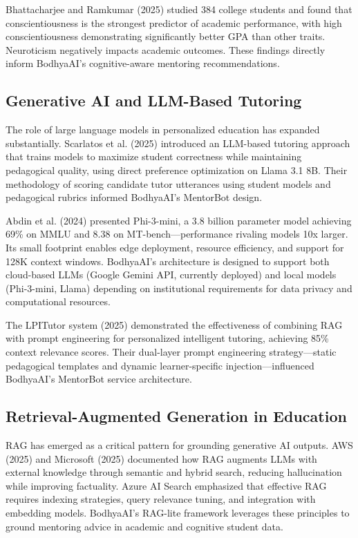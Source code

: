 \documentclass[conference]{IEEEtran}
\begin{document}
Bhattacharjee and Ramkumar (2025) studied 384 college students and found that conscientiousness is the strongest predictor of academic performance, with high conscientiousness demonstrating significantly better GPA than other traits. Neuroticism negatively impacts academic outcomes. These findings directly inform BodhyaAI's cognitive-aware mentoring recommendations.

\subsection{Generative AI and LLM-Based Tutoring}
The role of large language models in personalized education has expanded substantially. Scarlatos et al. (2025) introduced an LLM-based tutoring approach that trains models to maximize student correctness while maintaining pedagogical quality, using direct preference optimization on Llama 3.1 8B. Their methodology of scoring candidate tutor utterances using student models and pedagogical rubrics informed BodhyaAI's MentorBot design.

Abdin et al. (2024) presented Phi-3-mini, a 3.8 billion parameter model achieving 69\% on MMLU and 8.38 on MT-bench—performance rivaling models 10x larger. Its small footprint enables edge deployment, resource efficiency, and support for 128K context windows. BodhyaAI's architecture is designed to support both cloud-based LLMs (Google Gemini API, currently deployed) and local models (Phi-3-mini, Llama) depending on institutional requirements for data privacy and computational resources.

The LPITutor system (2025) demonstrated the effectiveness of combining RAG with prompt engineering for personalized intelligent tutoring, achieving 85\% context relevance scores. Their dual-layer prompt engineering strategy—static pedagogical templates and dynamic learner-specific injection—influenced BodhyaAI's MentorBot service architecture.

\subsection{Retrieval-Augmented Generation in Education}
RAG has emerged as a critical pattern for grounding generative AI outputs. AWS (2025) and Microsoft (2025) documented how RAG augments LLMs with external knowledge through semantic and hybrid search, reducing hallucination while improving factuality. Azure AI Search emphasized that effective RAG requires indexing strategies, query relevance tuning, and integration with embedding models. BodhyaAI's RAG-lite framework leverages these principles to ground mentoring advice in academic and cognitive student data.
\end{document}

